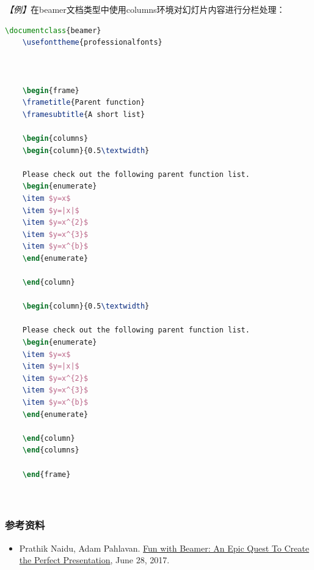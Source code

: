\emph{【例】}在beamer文档类型中使用columns环境对幻灯片内容进行分栏处理：
\begin{lstlisting}[language=TeX]
    \documentclass{beamer}
    \usefonttheme{professionalfonts}

    

    \begin{frame}
    \frametitle{Parent function}
    \framesubtitle{A short list}

    \begin{columns}
    \begin{column}{0.5\textwidth}

    Please check out the following parent function list.
    \begin{enumerate}
    \item $y=x$
    \item $y=|x|$
    \item $y=x^{2}$
    \item $y=x^{3}$
    \item $y=x^{b}$
    \end{enumerate}

    \end{column}

    \begin{column}{0.5\textwidth}

    Please check out the following parent function list.
    \begin{enumerate}
    \item $y=x$
    \item $y=|x|$
    \item $y=x^{2}$
    \item $y=x^{3}$
    \item $y=x^{b}$
    \end{enumerate}

    \end{column}
    \end{columns}

    \end{frame}

    
\end{lstlisting}

\subsubsection{参考资料}
\begin{itemize}
    \item Prathik Naidu, Adam Pahlavan.
          \href{http://web.mit.edu/rsi/www/pdfs/beamer-tutorial.pdf}{Fun with
              Beamer: An Epic Quest To Create the Perfect Presentation}, June 28,
          2017.
\end{itemize}

